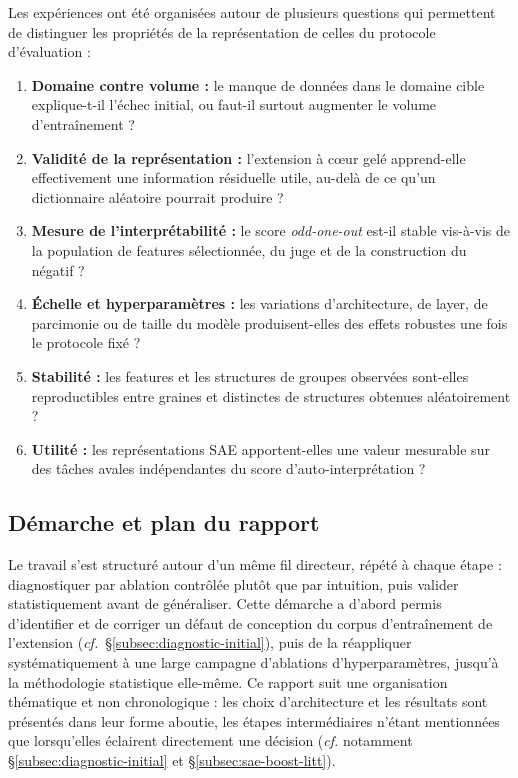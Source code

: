 \documentclass[11pt]{article}
\begin{document}
Les expériences ont été organisées autour de plusieurs questions qui permettent de
distinguer les propriétés de la représentation de celles du protocole d'évaluation :
\begin{enumerate}
  \item \textbf{Domaine contre volume :} le manque de données dans le domaine cible
  explique-t-il l'échec initial, ou faut-il surtout augmenter le volume d'entraînement ?
  \item \textbf{Validité de la représentation :} l'extension à cœur gelé apprend-elle
  effectivement une information résiduelle utile, au-delà de ce qu'un dictionnaire
  aléatoire pourrait produire ?
  \item \textbf{Mesure de l'interprétabilité :} le score \emph{odd-one-out} est-il
  stable vis-à-vis de la population de features sélectionnée, du juge et de la
  construction du négatif ?
  \item \textbf{Échelle et hyperparamètres :} les variations d'architecture, de layer,
  de parcimonie ou de taille du modèle produisent-elles des effets robustes une fois
  le protocole fixé ?
  \item \textbf{Stabilité :} les features et les structures de groupes observées sont-elles
  reproductibles entre graines et distinctes de structures obtenues aléatoirement ?
  \item \textbf{Utilité :} les représentations SAE apportent-elles une valeur mesurable
  sur des tâches avales indépendantes du score d'auto-interprétation ?
\end{enumerate}

\subsection{Démarche et plan du rapport}

Le travail
s'est structuré autour d'un même fil directeur, répété à chaque étape :
diagnostiquer par ablation contrôlée plutôt que par intuition, puis valider
statistiquement avant de généraliser. Cette démarche a d'abord permis
d'identifier et de corriger un défaut de conception du corpus d'entraînement
de l'extension (\emph{cf.}~\S\ref{subsec:diagnostic-initial}), puis de la
réappliquer systématiquement à une large campagne d'ablations
d'hyperparamètres, jusqu'à la méthodologie statistique elle-même. Ce rapport suit une organisation thématique et non
chronologique : les choix d'architecture et les résultats sont présentés dans
leur forme aboutie, les étapes intermédiaires n'étant mentionnées que
lorsqu'elles éclairent directement une décision (\emph{cf.} notamment
\S\ref{subsec:diagnostic-initial} et \S\ref{subsec:sae-boost-litt}).
\end{document}
